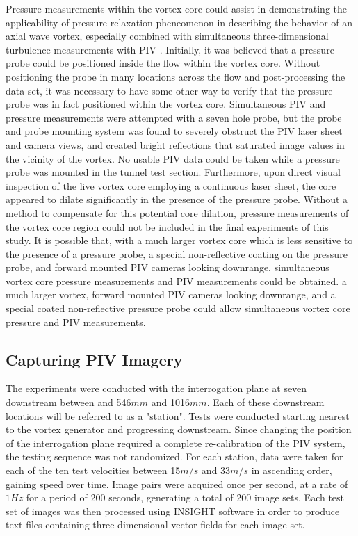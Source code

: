 Pressure measurements within the vortex core could assist in demonstrating the 
applicability of pressure relaxation pheneomenon in describing the behavior of 
an axial wave vortex, especially combined with simultaneous three-dimensional 
turbulence measurements with PIV \cite{ash2011}.
Initially, it was believed that a pressure probe could be positioned 
inside the flow within the vortex core. Without positioning the probe in many 
locations across the flow and post-processing the data set, it was necessary to 
have some other way to verify that the pressure probe was in fact positioned 
within the vortex core. Simultaneous PIV and pressure measurements were 
attempted with a seven hole probe, but the probe and probe mounting system was 
found to severely obstruct the PIV laser sheet and camera views, and created 
bright reflections that saturated image values in the vicinity of the vortex. 
No usable PIV data could be taken while a pressure probe was mounted in the 
tunnel test section. Furthermore, upon direct visual inspection of the live 
vortex core employing a continuous laser sheet, the core appeared to dilate 
significantly in 
the presence of the pressure probe. 
Without a method to compensate for this 
potential core dilation, pressure measurements of the vortex core region could 
not be included in the final experiments of this study. It is possible that, 
with a much larger vortex core which is less sensitive to the presence of a 
pressure probe, a special non-reflective coating on the pressure probe, and 
forward mounted PIV cameras looking downrange, simultaneous vortex core 
pressure measurements and PIV measurements could be obtained.
a much larger vortex, forward mounted PIV cameras looking downrange, and a 
special coated non-reflective pressure probe could allow simultaneous vortex 
core pressure and PIV measurements.

\subsection{Capturing PIV Imagery}

The experiments were conducted with the interrogation plane at seven 
downstream  between and 546$mm$ and 1016$mm$. Each of these downstream 
locations will be referred to as 
a "station". Tests were conducted starting nearest to the vortex 
generator and progressing downstream. Since changing the position of the 
interrogation plane required a complete re-calibration of the PIV system, the 
testing sequence was not randomized. For each station, data were taken for each 
of 
the ten test velocities between 15$m/s$ and 33$m/s$ in ascending order, gaining 
speed over time. Image pairs were acquired once per second, at a 
rate of $1Hz$ for a period of 200 seconds, generating a total of 200 image 
sets. Each test set of images was then processed using INSIGHT software in 
order to produce text files containing three-dimensional vector fields for each 
image set.

